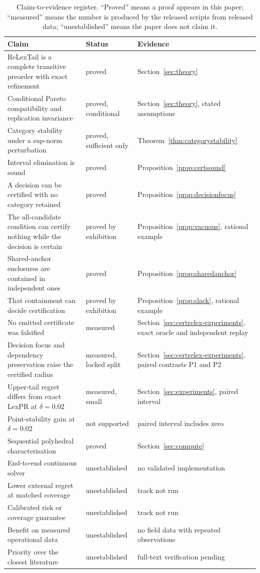 \begin{table}[tbp]\centering\small
\caption{Claim-to-evidence register. ``Proved'' means a proof appears in this paper; ``measured'' means the number is produced by the released scripts from released data; ``unestablished'' means the paper does not claim it.}
\label{tab:claims}
\begin{tabular}{@{}>{\raggedright\arraybackslash}p{.44\linewidth}>{\raggedright\arraybackslash}p{.15\linewidth}>{\raggedright\arraybackslash}p{.33\linewidth}@{}}\toprule
Claim & Status & Evidence\\\midrule
ReLexTail is a complete transitive preorder with exact refinement & proved & Section~\ref{sec:theory}\\
Conditional Pareto compatibility and replication invariance & proved, conditional & Section~\ref{sec:theory}, stated assumptions\\
Category stability under a sup-norm perturbation & proved, sufficient only & Theorem~\ref{thm:categorystability}\\
Interval elimination is sound & proved & Proposition~\ref{prop:certsound}\\
A decision can be certified with no category retained & proved & Proposition~\ref{prop:decisionfocus}\\
The all-candidate condition can certify nothing while the decision is certain & proved by exhibition & Proposition~\ref{prop:vacuous}, rational example\\
Shared-anchor enclosures are contained in independent ones & proved & Proposition~\ref{prop:sharedanchor}\\
That containment can decide certification & proved by exhibition & Proposition~\ref{prop:slack}, rational example\\
No emitted certificate was falsified & measured & Section~\ref{sec:certrelex-experiments}, exact oracle and independent replay\\
Decision focus and dependency preservation raise the certified radius & measured, locked split & Section~\ref{sec:certrelex-experiments}, paired contrasts P1 and P2\\
Upper-tail regret differs from exact LexPR at $\delta=0.02$ & measured, small & Section~\ref{sec:experiments}, paired interval\\
Point-stability gain at $\delta=0.02$ & not supported & paired interval includes zero\\
Sequential polyhedral characterisation & proved & Section~\ref{sec:compute}\\
End-to-end continuous solver & unestablished & no validated implementation\\
Lower external regret at matched coverage & unestablished & track not run\\
Calibrated risk or coverage guarantee & unestablished & track not run\\
Benefit on measured operational data & unestablished & no field data with repeated observations\\
Priority over the closest literature & unestablished & full-text verification pending\\\bottomrule
\end{tabular}
\end{table}

